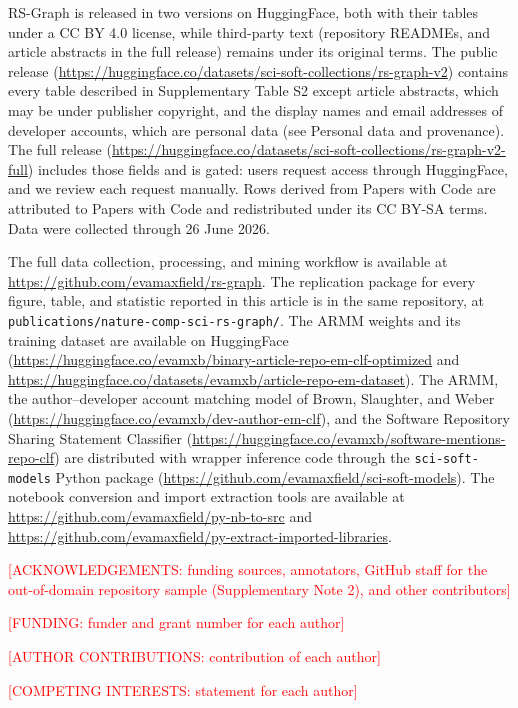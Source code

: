\documentclass[pdflatex,sn-nature]{sn-jnl}%
\begin{document}
\backmatter


RS-Graph is released in two versions on HuggingFace, both with their tables under a CC BY 4.0 license, while third-party text (repository READMEs, and article abstracts in the full release) remains under its original terms. The public release (\url{https://huggingface.co/datasets/sci-soft-collections/rs-graph-v2}) contains every table described in Supplementary Table S2 except article abstracts, which may be under publisher copyright, and the display names and email addresses of developer accounts, which are personal data (see Personal data and provenance). The full release (\url{https://huggingface.co/datasets/sci-soft-collections/rs-graph-v2-full}) includes those fields and is gated: users request access through HuggingFace, and we review each request manually. Rows derived from Papers with Code are attributed to Papers with Code and redistributed under its CC BY-SA terms. Data were collected through 26 June 2026.


The full data collection, processing, and mining workflow is available at \url{https://github.com/evamaxfield/rs-graph}. The replication package for every figure, table, and statistic reported in this article is in the same repository, at \texttt{publications/nature-comp-sci-rs-graph/}. The ARMM weights and its training dataset are available on HuggingFace (\url{https://huggingface.co/evamxb/binary-article-repo-em-clf-optimized} and \url{https://huggingface.co/datasets/evamxb/article-repo-em-dataset}). The ARMM, the author--developer account matching model of Brown, Slaughter, and Weber~\cite{brown2026code} (\url{https://huggingface.co/evamxb/dev-author-em-clf}), and the Software Repository Sharing Statement Classifier (\url{https://huggingface.co/evamxb/software-mentions-repo-clf}) are distributed with wrapper inference code through the \texttt{sci-soft-models} Python package (\url{https://github.com/evamaxfield/sci-soft-models}). The notebook conversion and import extraction tools are available at \url{https://github.com/evamaxfield/py-nb-to-src} and \url{https://github.com/evamaxfield/py-extract-imported-libraries}.




\textcolor{red}{[ACKNOWLEDGEMENTS: funding sources, annotators, GitHub staff for the out-of-domain repository sample (Supplementary Note 2), and other contributors]}


\textcolor{red}{[FUNDING: funder and grant number for each author]}


\textcolor{red}{[AUTHOR CONTRIBUTIONS: contribution of each author]}


\textcolor{red}{[COMPETING INTERESTS: statement for each author]}

\end{document}
